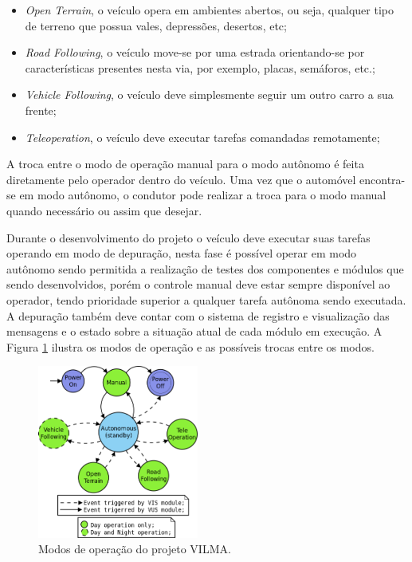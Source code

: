\documentclass[conference]{IEEEtran}
\begin{document}
\begin{itemize}
	\item \textit{Open Terrain}, o veículo opera em ambientes abertos, ou seja, qualquer tipo de terreno que possua vales, depressões, desertos, etc;
	\item \textit{Road Following}, o veículo move-se por uma estrada orientando-se por características presentes nesta via, por exemplo, placas, semáforos, etc.;
	\item \textit{Vehicle Following}, o veículo deve simplesmente seguir um outro carro a sua frente;
	\item \textit{Teleoperation}, o veículo deve executar tarefas comandadas remotamente;
\end{itemize}

A troca entre o modo de operação manual para o modo autônomo é feita diretamente pelo operador dentro do veículo. Uma vez que o automóvel encontra-se em modo autônomo, o condutor pode realizar a troca para o modo manual quando necessário ou assim que desejar.

Durante o desenvolvimento do projeto o veículo deve executar suas tarefas operando em modo de depuração, nesta fase é possível operar em modo autônomo sendo permitida a realização de testes dos componentes e módulos que sendo desenvolvidos, porém o controle manual deve estar sempre disponível ao operador, tendo prioridade superior a qualquer tarefa autônoma sendo executada. A depuração também deve contar com o sistema de registro e visualização das mensagens e o estado sobre a situação atual de cada módulo em execução. A Figura \ref{fig:VILMA_OPERATIONAL_MODE} ilustra os modos de operação e as possíveis trocas entre os modos.

\begin{figure}[h]
	\centering
	\includegraphics[width=200px,keepaspectratio]{imagens/VILMA_OPERATIONAL_MODE}
	\caption{Modos de operação do projeto VILMA.}
	\label{fig:VILMA_OPERATIONAL_MODE}
\end{figure}
\end{document}
